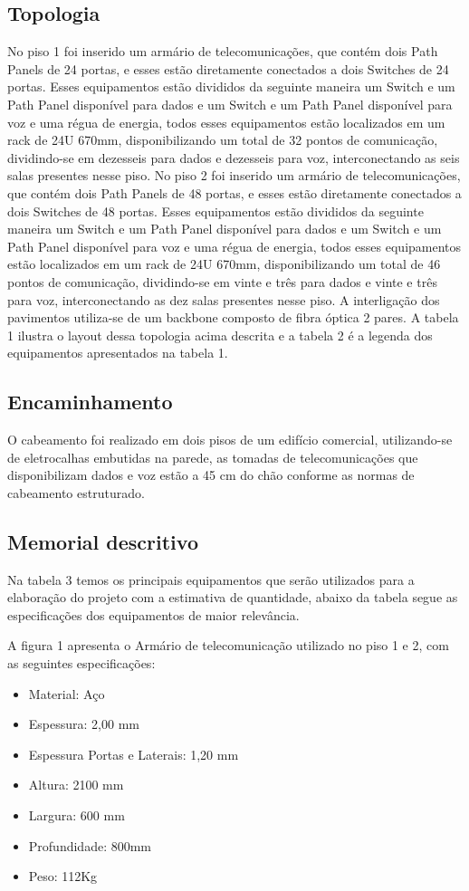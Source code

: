 \documentclass[	DIV=calc,%
							paper=a4,%
							fontsize=12pt,%
							onecolumn]{scrartcl}	 					%
\begin{document}
\subsection{Topologia}
No piso 1 foi inserido um armário de telecomunicações, que contém dois Path Panels de 24 portas, e esses estão diretamente conectados a dois Switches de 24 portas. Esses equipamentos estão divididos da seguinte maneira um Switch e um Path Panel disponível para dados e um Switch e um Path Panel disponível para voz e uma régua de energia, todos esses equipamentos estão localizados em um rack de 24U 670mm, disponibilizando um total de 32 pontos de comunicação, dividindo-se em dezesseis para dados e dezesseis para voz, interconectando as seis salas presentes nesse piso.
No piso 2 foi inserido um armário de telecomunicações, que contém dois Path Panels de 48 portas, e esses estão diretamente conectados a dois Switches de 48 portas. Esses equipamentos estão divididos da seguinte maneira um Switch e um Path Panel disponível para dados e um Switch e um Path Panel disponível para voz e uma régua de energia, todos esses equipamentos estão localizados em um rack de 24U 670mm, disponibilizando um total de 46 pontos de comunicação, dividindo-se em vinte e três para dados e vinte e três para voz, interconectando as dez salas presentes nesse piso. A interligação dos pavimentos utiliza-se de um backbone composto de fibra óptica 2 pares.
A tabela 1 ilustra o layout dessa topologia acima descrita e a tabela 2 é a legenda dos equipamentos apresentados na tabela 1.




\subsection{Encaminhamento}
O cabeamento foi realizado em dois pisos de um edifício comercial, utilizando-se de eletrocalhas embutidas na parede, as tomadas de telecomunicações que disponibilizam dados e voz estão a 45 cm do chão conforme as normas de cabeamento estruturado.

\subsection{Memorial descritivo}
Na tabela 3 temos os principais equipamentos que serão utilizados para a elaboração do projeto com a estimativa de quantidade, abaixo da tabela segue as especificações dos equipamentos de maior relevância.


A figura 1 apresenta o Armário de telecomunicação utilizado no piso 1 e 2, com as seguintes especificações: 
\begin{itemize}
\item Material: Aço
\item Espessura: 2,00 mm
\item Espessura Portas e Laterais: 1,20 mm
\item Altura: 2100 mm
\item Largura: 600 mm
\item Profundidade: 800mm
\item Peso: 112Kg
\end{itemize}
\end{document}
